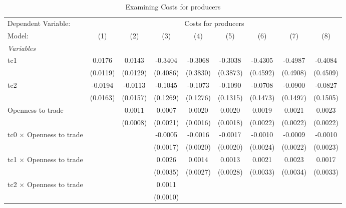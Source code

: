 
\begin{table}[htbp]
   \caption{Examining Costs for producers}
   \centering
   \begin{tabular}{lcccccccc}
      \tabularnewline \midrule \midrule
      Dependent Variable: & \multicolumn{8}{c}{Costs for producers}\\
      Model:                                  & (1)      & (2)      & (3)      & (4)      & (5)      & (6)      & (7)      & (8)\\  
      \midrule
      \emph{Variables}\\
      tc1                                     & 0.0176   & 0.0143   & -0.3404  & -0.3068  & -0.3038  & -0.4305  & -0.4987  & -0.4084\\   
                                              & (0.0119) & (0.0129) & (0.4086) & (0.3830) & (0.3873) & (0.4592) & (0.4908) & (0.4509)\\   
      tc2                                     & -0.0194  & -0.0113  & -0.1045  & -0.1073  & -0.1090  & -0.0708  & -0.0900  & -0.0827\\   
                                              & (0.0163) & (0.0157) & (0.1269) & (0.1276) & (0.1315) & (0.1473) & (0.1497) & (0.1505)\\   
      Openness to trade                       &          & 0.0011   & 0.0007   & 0.0020   & 0.0020   & 0.0019   & 0.0021   & 0.0023\\   
                                              &          & (0.0008) & (0.0021) & (0.0016) & (0.0018) & (0.0022) & (0.0022) & (0.0022)\\   
      tc0 $\times$ Openness to trade          &          &          & -0.0005  & -0.0016  & -0.0017  & -0.0010  & -0.0009  & -0.0010\\   
                                              &          &          & (0.0017) & (0.0020) & (0.0020) & (0.0024) & (0.0022) & (0.0023)\\   
      tc1 $\times$ Openness to trade          &          &          & 0.0026   & 0.0014   & 0.0013   & 0.0021   & 0.0023   & 0.0017\\   
                                              &          &          & (0.0035) & (0.0027) & (0.0028) & (0.0033) & (0.0034) & (0.0033)\\   
      tc2 $\times$ Openness to trade          &          &          & 0.0011   &          &          &          &          &   \\   
                                              &          &          & (0.0010) &          &          &          &          &   \\   

\end{tabular}
\end{table}
